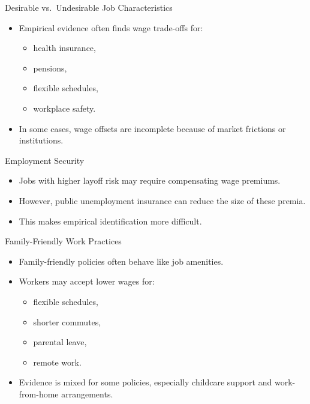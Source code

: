 \documentclass[aspectratio=169]{beamer}
\begin{document}
\begin{frame}{Desirable vs.\ Undesirable Job Characteristics}
\transfade
\begin{itemize}
  \item Empirical evidence often finds wage trade-offs for:
  \begin{itemize}
    \item health insurance,
    \item pensions,
    \item flexible schedules,
    \item workplace safety.
  \end{itemize}
  \item In some cases, wage offsets are incomplete because of market frictions or institutions.
\end{itemize}
\end{frame}

\begin{frame}{Employment Security}
\transfade
\begin{itemize}
  \item Jobs with higher layoff risk may require compensating wage premiums.
  \item However, public unemployment insurance can reduce the size of these premia.
  \item This makes empirical identification more difficult.
\end{itemize}
\end{frame}

\begin{frame}{Family-Friendly Work Practices}
\transfade
\begin{itemize}
  \item Family-friendly policies often behave like job amenities.
  \item Workers may accept lower wages for:
  \begin{itemize}
    \item flexible schedules,
    \item shorter commutes,
    \item parental leave,
    \item remote work.
  \end{itemize}
  \item Evidence is mixed for some policies, especially childcare support and work-from-home arrangements.
\end{itemize}
\end{frame}
\end{document}
